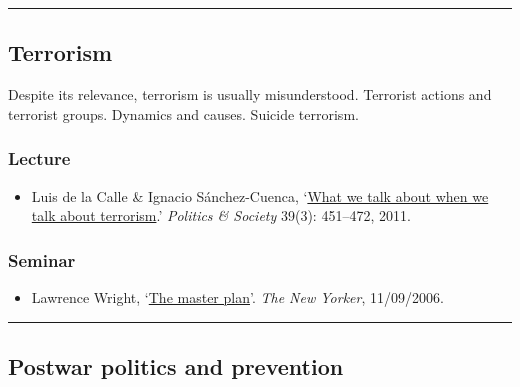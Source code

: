 \documentclass[12pt, a4paper]{article}
\begin{document}
\hrule %

\subsection{Terrorism}\label{terrorism}

Despite its relevance, terrorism is usually misunderstood. Terrorist actions and terrorist groups. Dynamics and causes. Suicide terrorism.

\subsubsection*{Lecture}

\begin{itemize}
\setlength\itemsep{0pt}
\item Luis de la Calle \& Ignacio Sánchez-Cuenca, `\href{https://doi.org/10.1177/0032329211415506}{What we talk about when we talk about terrorism}.' \textit{Politics \& Society} 39(3): 451--472, 2011.
\end{itemize}

\subsubsection*{Seminar}

\begin{itemize}
\setlength\itemsep{0pt}
\item Lawrence Wright, `\href{https://www.newyorker.com/magazine/2006/09/11/the-master-plan}{The master plan}'. \textit{The New Yorker}, 11/09/2006.
\end{itemize}

\hrule %

\subsection{Postwar politics and prevention}\label{postwar}
\end{document}
